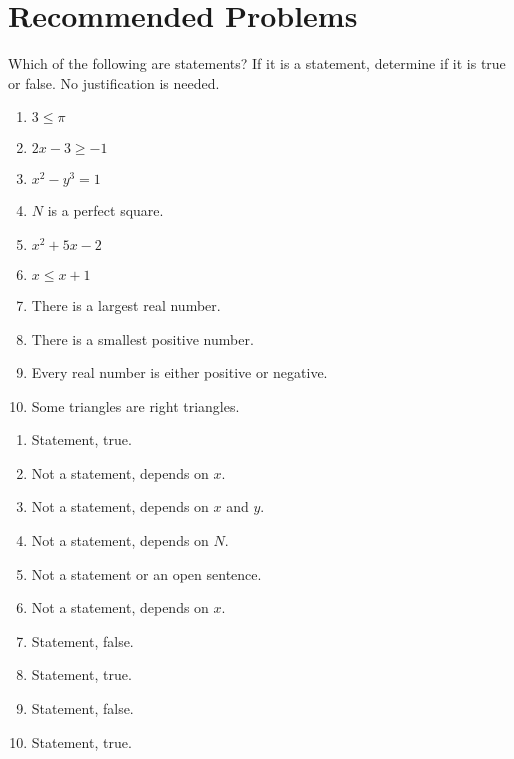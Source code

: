 \section{Recommended Problems}
\begin{recommended}
  Which of the following are statements?
  If it is a statement, determine if it is true or false.
  No justification is needed.
  \begin{enumerate}
    \item $3 \leq \pi$
    \item $2x-3 \geq -1$
    \item $x^2-y^3 = 1$
    \item $N$ is a perfect square.
    \item $x^2+5x-2$
    \item $x \leq x+1$
    \item There is a largest real number.
    \item There is a smallest positive number.
    \item Every real number is either positive or negative.
    \item Some triangles are right triangles.
  \end{enumerate}
\end{recommended}
\begin{sol}
  \begin{enumerate}
    \item Statement, true.
    \item Not a statement, depends on $x$.
    \item Not a statement, depends on $x$ and $y$.
    \item Not a statement, depends on $N$.
    \item Not a statement or an open sentence.
    \item Not a statement, depends on $x$.
    \item Statement, false.
    \item Statement, true.
    \item Statement, false.
    \item Statement, true. \qedhere
  \end{enumerate}
\end{sol}

